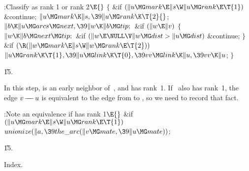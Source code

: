 \Y\B\4:Classify  as rank 1 or rank 2\X${}\E{}$\6
${}\{{}$\1\6
\&{if} ${}(\|u\MG\\{mark}\E\|s\W\|u\MG\\{rank}\E\T{1}){}$\1\5
\&{continue};\2\6
${}\|u\MG\\{mark}\K\|s,\39\|u\MG\\{rank}\K\T{2}{}$;\6
${}\|b\K\|u\MG\\{arcs}\MG\\{next},\39\|w\K\|b\MG\\{tip};{}$\6
\&{if} ${}(\|w\E\|v){}$\5
${}\{{}$\1\6
${}\|w\K\|b\MG\\{next}\MG\\{tip};{}$\6
\&{if} ${}(\|w\E\NULL\V\|w\MG\\{dist}>\|u\MG\\{dist}){}$\1\5
\&{continue};\2\6
\4${}\}{}$\2\6
\&{if} ${}(\R(\|w\MG\\{mark}\E\|s\W\|w\MG\\{rank}\E\T{2})){}$\1\5
${}\|u\MG\\{rank}\K\T{1},\39\|u\MG\\{link}\K\T{0},\39\\{vv}\MG\\{link}\K\|u,\39%
\\{vv}\K\|u{}$;\2\6
\4${}\}{}$\2\par
\U15.\fi

In this step,  is an early neighbor of~, and
 has
rank~1. If ~also has rank~1, the edge $v\mathrel{\!\mathrel-\mkern-8mu\mathrel-\mkern-8mu\mathrel-\!} u$ is equivalent
to the edge from  to , so we need to
record
that fact.

\Y\B\4:Note an equivalence if  has rank 1\X${}\E{}$\6
\&{if} ${}(\|u\MG\\{mark}\E\|s\W\|u\MG\\{rank}\E\T{1}){}$\1\5
${}\\{unionize}(\|a,\39\\{the\_arc}(\|v\MG\\{mate},\39\|u\MG\\{mate})){}$;\2\par
\U15.\fi

Index.
\fi

\inx
\fin
\con
